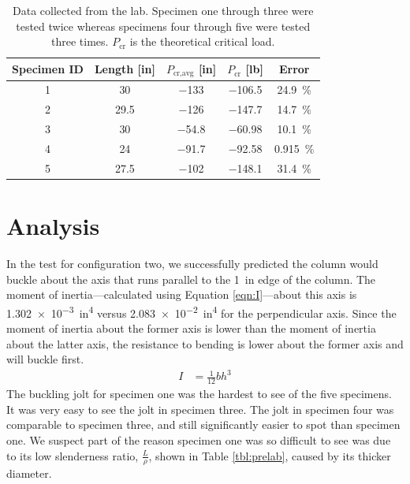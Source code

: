 \documentclass[12 pt]{article}
\begin{document}
\begin{table}[!htbp]
\caption{Data collected from the lab. Specimen one through three were tested twice whereas specimens four through five were tested three times. $P_\text{cr}$ is the theoretical critical load.}
\begin{center}
	\begin{tabular}{|c|c|c|c|c|}
		\hline
		Specimen ID&Length [\unit{in}]&$P_\text{cr,avg}$ [\unit{in}]&$P_\text{cr}$ [\unit{lb}]&Error\\
		\hline
		\num{1}&\num{30}&\num{-133}&\num{-106.5}&\qty{24.9}{\percent}\\
		\hline
		\num{2}&\num{29.5}&\num{-126}&\num{-147.7}&\qty{14.7}{\percent}\\
		\hline
		\num{3}&\num{30}&\num{-54.8}&\num{-60.98}&\qty{10.1}{\percent}\\
		\hline
		\num{4}&\num{24}&\num{-91.7}&\num{-92.58}&\qty{0.915}{\percent}\\
		\hline
		\num{5}&\num{27.5}&\num{-102}&\num{-148.1}&\qty{31.4}{\percent}\\
		\hline
	\end{tabular}
\end{center}
\label{tbl:data}
\end{table}

\section{Analysis} \label{analysis}
In the test for configuration two, we successfully predicted the column would buckle about the axis that runs parallel to the \qty{1}{in} edge of the column. The moment of inertia---calculated using Equation \ref{eqn:I}---about this axis is \qty{1.302e-3}{in^4} versus \qty{2.083e-2}{in^4} for the perpendicular axis. Since the moment of inertia about the former axis is lower than the moment of inertia about the latter axis, the resistance to bending is lower about the former axis and will buckle first.
\begin{align}
	I&=\frac{1}{12}bh^3\label{eqn:I}
\end{align}
The buckling jolt for specimen one was the hardest to see of the five specimens. It was very easy to see the jolt in specimen three. The jolt in specimen four was comparable to specimen three, and still significantly easier to spot than specimen one. We suspect part of the reason specimen one was so difficult to see was due to its low slenderness ratio, $\frac{L}{\rho}$, shown in Table \ref{tbl:prelab}, caused by its thicker diameter.
\end{document}
